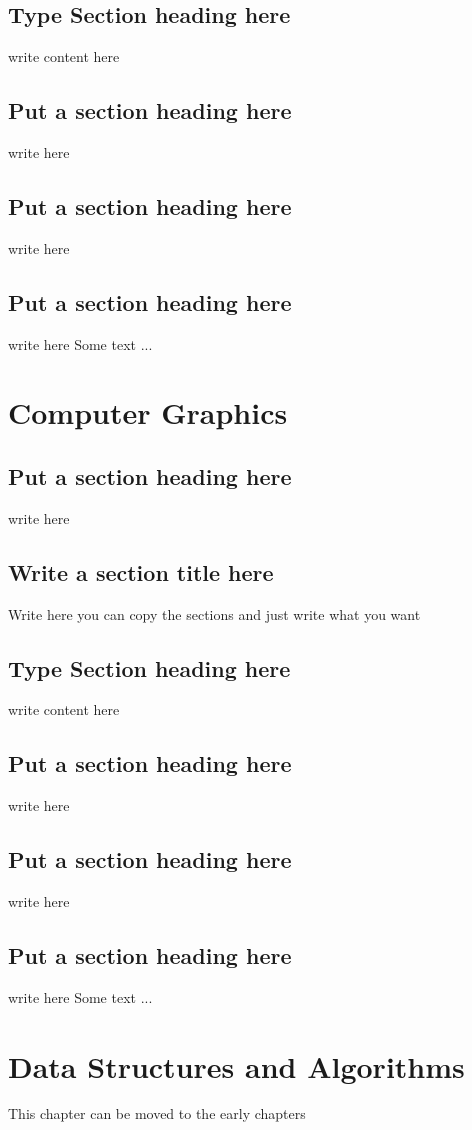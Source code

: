 \documentclass[a4paper,twoside]{scrbook}
\begin{document}
\section{Type Section heading here}
write content here
\section{Put a section heading here}
write here
\section{Put a section heading here}
write here
\section{Put a section heading here}
write here
Some text ...
\chapter{Computer Graphics}\label{ch12}
\section{Put a section heading here}
write here
\section{Write a section title here}
Write here you can copy the sections and just write what you want
\section{Type Section heading here}
write content here
\section{Put a section heading here}
write here
\section{Put a section heading here}
write here
\section{Put a section heading here}
write here
Some text ...
\chapter{Data Structures and Algorithms}\label{ch13}
This chapter can be moved to the early chapters
\end{document}
